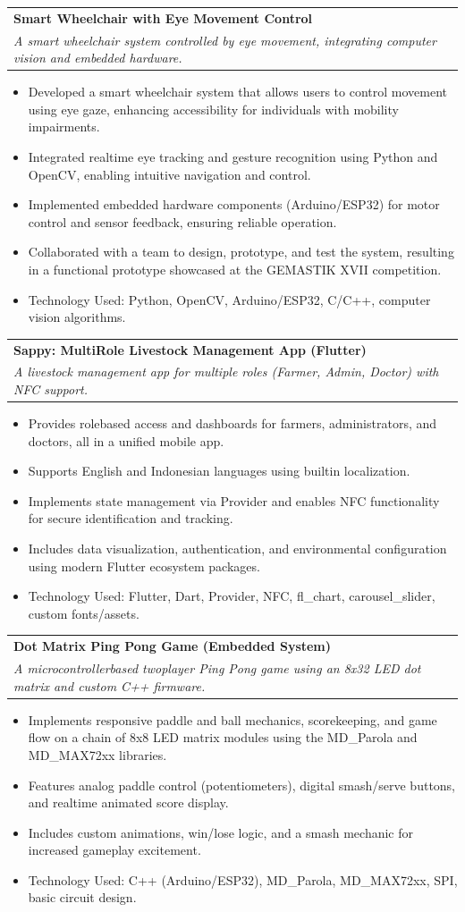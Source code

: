 \documentclass[a4paper,11pt]{article}
\makeatletter
\newcommand{\resumeProject}[4]{
\vspace{0.5mm}\item
    \begin{tabular*}{0.98\textwidth}[t]{l@{\extracolsep{\fill}}r}
        \textbf{#1} & \textit{\footnotesize{#3}} \\
        \footnotesize{\textit{#2}} & \footnotesize{#4}
    \end{tabular*}
    \vspace{-2.4mm}
    \par
}
\newcommand{\resumeItemListStart}{\begin{justify}\begin{itemize}[leftmargin=3ex, rightmargin=2ex, noitemsep,labelsep=1.2mm,itemsep=0mm]\small}
\newcommand{\resumeItemListEnd}{\end{itemize}\end{justify}\vspace{-2mm}}
\makeatother
\begin{document}
\resumeProject
{Smart Wheelchair with Eye Movement Control} %
{A smart wheelchair system controlled by eye movement, integrating computer vision and embedded hardware.} %
{} %
{}
\resumeItemListStart
\item {Developed a smart wheelchair system that allows users to control movement using eye gaze, enhancing accessibility for individuals with mobility impairments.}
\item {Integrated real\-time eye tracking and gesture recognition using Python and OpenCV, enabling intuitive navigation and control.}
\item {Implemented embedded hardware components (Arduino/ESP32) for motor control and sensor feedback, ensuring reliable operation.}
\item {Collaborated with a team to design, prototype, and test the system, resulting in a functional prototype showcased at the GEMASTIK XVII competition.}
\item {Technology Used: Python, OpenCV, Arduino/ESP32, C/C++, computer vision algorithms.}
\resumeItemListEnd
\vspace{-2mm}

\resumeProject
{Sappy: Multi\-Role Livestock Management App (Flutter)} %
{A livestock management app for multiple roles (Farmer, Admin, Doctor) with NFC support.}
{} %
{}
\resumeItemListStart
\item {Provides role\-based access and dashboards for farmers, administrators, and doctors, all in a unified mobile app.}
\item {Supports English and Indonesian languages using built\-in localization.}
\item {Implements state management via Provider and enables NFC functionality for secure identification and tracking.}
\item {Includes data visualization, authentication, and environmental configuration using modern Flutter ecosystem packages.}
\item {Technology Used: Flutter, Dart, Provider, NFC, fl\_chart, carousel\_slider, custom fonts/assets.}
\resumeItemListEnd
\vspace{-2mm}

\resumeProject
{Dot Matrix Ping Pong Game (Embedded System)} %
{A microcontroller\-based two\-player Ping Pong game using an 8x32 LED dot matrix and custom C++ firmware.} %
{} %
{}
\resumeItemListStart
\item {Implements responsive paddle and ball mechanics, scorekeeping, and game flow on a chain of 8x8 LED matrix modules using the MD\_Parola and MD\_MAX72xx libraries.}
\item {Features analog paddle control (potentiometers), digital smash/serve buttons, and real\-time animated score display.}
\item {Includes custom animations, win/lose logic, and a smash mechanic for increased gameplay excitement.}
\item {Technology Used: C++ (Arduino/ESP32), MD\_Parola, MD\_MAX72xx, SPI, basic circuit design.}
\resumeItemListEnd
\vspace{-2mm}
\end{document}
